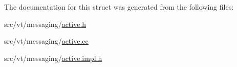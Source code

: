 The documentation for this struct was generated from the following files\+:\begin{DoxyCompactItemize}
\item 
src/vt/messaging/\hyperlink{active_8h}{active.\+h}\item 
src/vt/messaging/\hyperlink{active_8cc}{active.\+cc}\item 
src/vt/messaging/\hyperlink{active_8impl_8h}{active.\+impl.\+h}\end{DoxyCompactItemize}
